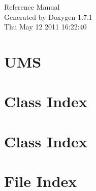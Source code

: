 \documentclass[a4paper]{book}
\begin{document}
\hypersetup{pageanchor=false}
\begin{titlepage}
\vspace*{7cm}
\begin{center}
{\Large Reference Manual}\\
\vspace*{1cm}
{\large Generated by Doxygen 1.7.1}\\
\vspace*{0.5cm}
{\small Thu May 12 2011 16:22:40}\\
\end{center}
\end{titlepage}
\clearemptydoublepage
{}
\tableofcontents
\clearemptydoublepage
{}
\hypersetup{pageanchor=true}
\chapter{UMS}
\label{index}\hypertarget{index}{}
\chapter{Class Index}

\chapter{Class Index}

\chapter{File Index}

\end{document}
